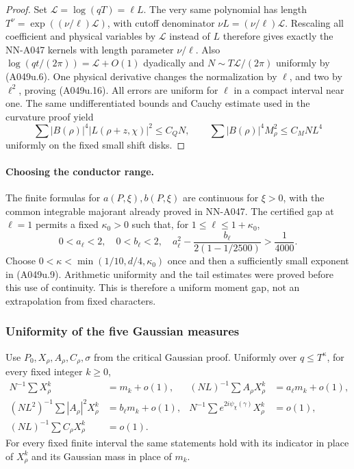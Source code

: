 \begin{proof}
Set $\mathcal L=\log(qT)=\ell L$.
The very same polynomial has length
$T^\nu=\exp((\nu/\ell)\mathcal L)$, with cutoff denominator
$\nu L=(\nu/\ell)\mathcal L$.
Rescaling all coefficient and physical variables by
$\mathcal L$ instead of $L$ therefore gives exactly the
NN-A047 kernels with length parameter $\nu/\ell$.
Also $\log(qt/(2\pi))=\mathcal L+O(1)$ dyadically and
$N\sim T\mathcal L/(2\pi)$ uniformly by (A049u.6).
One physical derivative changes the normalization by
$\ell$, and two by $\ell^2$, proving (A049u.16).
All errors are uniform for $\ell$ in a compact interval
near one. The same undifferentiated bounds and Cauchy
estimate used in the curvature proof yield
\[
 \sum|B(\rho)|^4|L(\rho+z,\chi)|^2\le C_QN,\qquad
 \sum|B(\rho)|^4M_\rho^2\le C_MNL^4
\tag{A049u.18}
\]
uniformly on the fixed small shift disks.
\end{proof}

\paragraph{Choosing the conductor range.}
The finite formulas for $a(P,\xi),b(P,\xi)$ are continuous
for $\xi>0$, with the common integrable majorant already
proved in NN-A047. The certified gap at $\ell=1$ permits
a fixed $\kappa_0>0$ such that, for $1\le\ell\le1+\kappa_0$,
\[
 0<a_\ell<2,\quad0<b_\ell<2,\quad
 a_\ell^2-\frac{b_\ell}{2(1-1/2500)}>\frac1{4000}.
\tag{A049u.19}
\]
Choose $0<\kappa<\min(1/10,d/4,\kappa_0)$ once and then
a sufficiently small exponent in (A049u.9).
Arithmetic uniformity and the tail estimates were proved
before this use of continuity. This is therefore a uniform
moment gap, not an extrapolation from fixed characters.

\subsubsection*{Uniformity of the five Gaussian measures}

\begin{lemma}
\label{lem:A049-uniform-gaussian}
Use $P_0,X_\rho,A_\rho,C_\rho,\sigma$ from the critical
Gaussian proof. Uniformly over $q\le T^\kappa$, for
every fixed integer $k\ge0$,
\[
\begin{aligned}
 N^{-1}\sum X_\rho^k&=m_k+o(1),&
 (NL)^{-1}\sum A_\rho X_\rho^k&=a_\ell m_k+o(1),\\
 (NL^2)^{-1}\sum|A_\rho|^2X_\rho^k&=b_\ell m_k+o(1),&
 N^{-1}\sum e^{2i\psi_\chi(\gamma)}X_\rho^k&=o(1),\\
 (NL)^{-1}\sum C_\rho X_\rho^k&=o(1).&&
\end{aligned}
\tag{A049u.20}
\]
For every fixed finite interval the same statements hold
with its indicator in place of $X_\rho^k$ and its Gaussian
mass in place of $m_k$.
\end{lemma}

